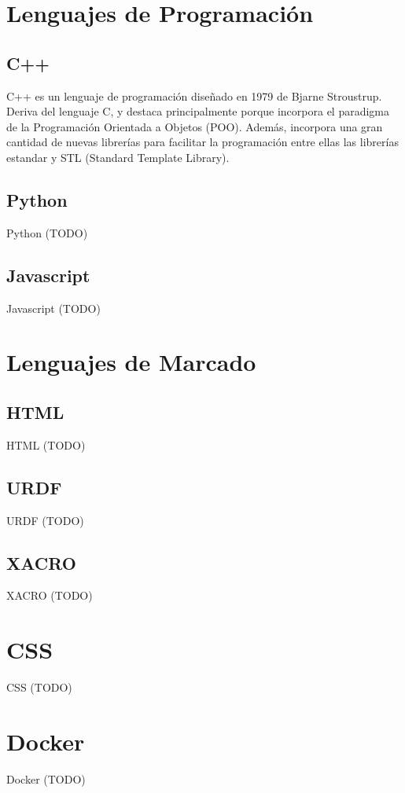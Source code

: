 \section{Lenguajes de Programación}
\subsection{C++}
\label{sec:c++}

C++ es un lenguaje de programación diseñado en 1979 de Bjarne Stroustrup. Deriva del lenguaje C, y destaca principalmente porque incorpora el paradigma de la Programación Orientada a Objetos (POO). Además, incorpora una gran cantidad de nuevas librerías para facilitar la programación entre ellas las librerías estandar y STL (Standard Template Library).

\subsection{Python}
\label{sec:python}

Python (TODO)

\subsection{Javascript}
\label{sec:javascript}

Javascript (TODO)

\section{Lenguajes de Marcado}
\subsection{HTML}
\label{sec:html}

HTML (TODO)

\subsection{URDF}
\label{sec:urdf}

URDF (TODO)

\subsection{XACRO}
\label{sec:xacro}

XACRO (TODO)

\section{CSS}
\label{sec:css}

CSS (TODO)

\section{Docker}
\label{sec:docker}

Docker (TODO)
